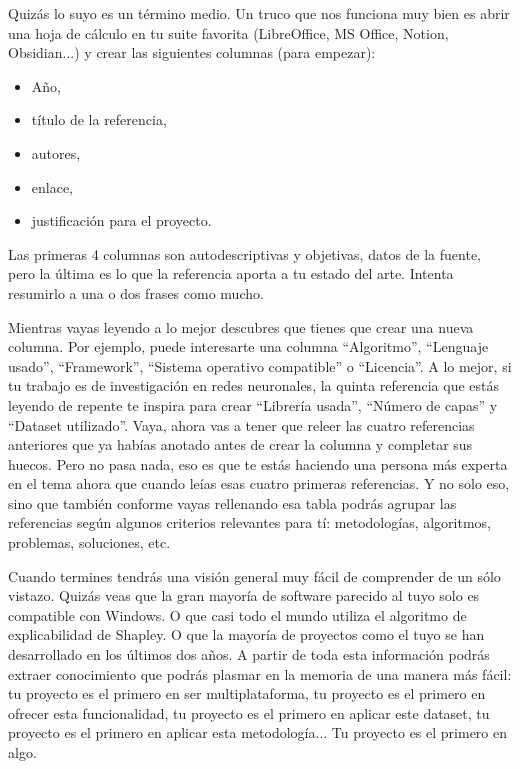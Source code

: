 Quizás lo suyo es un término medio. Un truco que nos funciona muy bien es abrir una hoja de cálculo en tu suite favorita (LibreOffice, MS Office, Notion, Obsidian...) y crear las siguientes columnas (para empezar):
\begin{itemize}
    \item Año,
    \item título de la referencia,
    \item autores,
    \item enlace,
    \item justificación para el proyecto.
\end{itemize}

Las primeras 4 columnas son autodescriptivas y objetivas, datos de la fuente, pero la última es lo que la referencia aporta a tu estado del arte. Intenta resumirlo a una o dos frases como mucho.

Mientras vayas leyendo a lo mejor descubres que tienes que crear una nueva columna. Por ejemplo, puede interesarte una columna ``Algoritmo'', ``Lenguaje usado'', ``Framework'', ``Sistema operativo compatible'' o ``Licencia''. A lo mejor, si tu trabajo es de investigación en redes neuronales, la quinta referencia que estás leyendo de repente te inspira para crear ``Librería usada'', ``Número de capas'' y ``Dataset utilizado''. Vaya, ahora vas a tener que releer las cuatro referencias anteriores que ya habías anotado antes de crear la columna y completar sus huecos. Pero no pasa nada, eso es que te estás haciendo una persona más experta en el tema ahora que cuando leías esas cuatro primeras referencias. Y no solo eso, sino que también conforme vayas rellenando esa tabla podrás agrupar las referencias según algunos criterios relevantes para tí: metodologías, algoritmos, problemas, soluciones, etc.

Cuando termines tendrás una visión general muy fácil de comprender de un sólo vistazo. Quizás veas que la gran mayoría de software parecido al tuyo solo es compatible con Windows. O que casi todo el mundo utiliza el algoritmo de explicabilidad de Shapley. O que la mayoría de proyectos como el tuyo se han desarrollado en los últimos dos años. A partir de toda esta información podrás extraer conocimiento que podrás plasmar en la memoria de una manera más fácil: tu proyecto es el primero en ser multiplataforma, tu proyecto es el primero en ofrecer esta funcionalidad, tu proyecto es el primero en aplicar este dataset, tu proyecto es el primero en aplicar esta metodología... Tu proyecto es el primero en algo.

